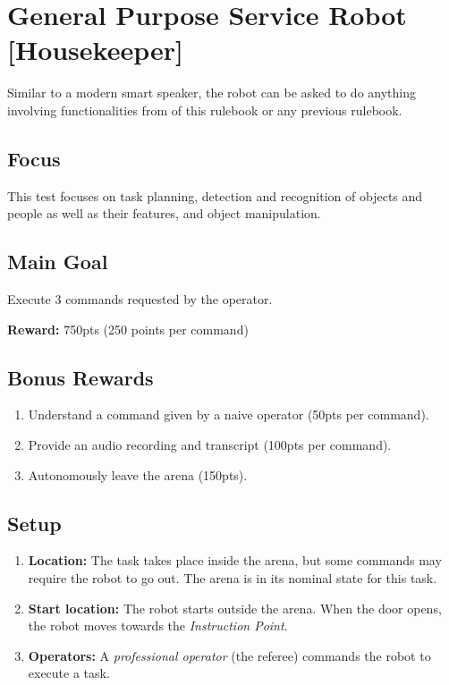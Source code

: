 \section{General Purpose Service Robot [Housekeeper]}
\label{test:gpsr}
Similar to a modern smart speaker, the robot can be asked to do anything involving functionalities from \SONE{} of this rulebook or any previous rulebook.

\subsection*{Focus}
This test focuses on task planning, detection and recognition of objects and people as well as their features, and object manipulation.

\subsection*{Main Goal}
Execute 3 commands requested by the operator.

\noindent\textbf{Reward:} 750pts (250 points per command)\\

\subsection*{Bonus Rewards}
\begin{enumerate}[nosep]
	\item Understand a command given by a naive operator (50pts per command).
	\item Provide an audio recording and transcript (100pts per command).
	\item Autonomously leave the arena (150pts).
\end{enumerate}

%
%
\subsection*{Setup}
\begin{enumerate}[nosep]
	\item \textbf{Location:} The task takes place inside the arena, but some commands may require the robot to go out. The arena is in its nominal state for this task.
	\item \textbf{Start location:} The robot starts outside the arena. When the door opens, the robot moves towards the \textit{Instruction Point}.
	\item \textbf{Operators:} A \emph{professional operator} (the referee) commands the robot to execute a task.
\end{enumerate}


